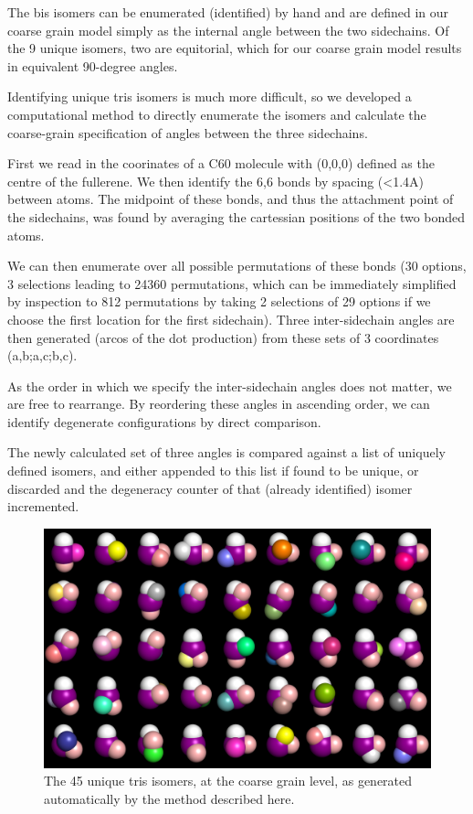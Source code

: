 \documentclass[journal=nanofd,manuscript=suppinfo]{achemso}
\begin{document}
The bis isomers can be enumerated (identified) by hand and are defined in our
coarse grain model simply as the internal angle between the two sidechains. Of
the 9 unique isomers, two are equitorial, which for our coarse grain model
results in equivalent 90-degree angles.

Identifying unique tris isomers is much more difficult, so we developed
a computational method to directly enumerate the isomers and calculate the
coarse-grain specification of angles between the three sidechains.

First we read in the coorinates of a C60 molecule with (0,0,0) defined as the
centre of the fullerene. We then identify the 6,6 bonds by spacing (<1.4A)
between atoms.
The midpoint of these bonds, and thus the attachment point of the sidechains,
was found by averaging the cartessian positions of the two bonded atoms.

We can then enumerate over all possible permutations of these bonds (30
options, 3 selections leading to 24360 permutations, which can be immediately
simplified by inspection to 812 permutations by taking 2 selections of 29
options if we choose the first location for the first sidechain).
Three inter-sidechain angles are then generated (arcos of the dot production)
from these sets of 3 coordinates (a,b;a,c;b,c).

As the order in which we specify the inter-sidechain angles does not matter, we
are free to rearrange.
By reordering these angles in ascending order, we can identify degenerate
configurations by direct comparison.

The newly calculated set of three angles is compared against a list of uniquely
defined isomers, and either appended to this list if found to be unique, or
discarded and the degeneracy counter of that (already identified) isomer incremented.

\begin{figure}[ht!]
    \begin{center}
        \includegraphics[width=\textwidth]{tris_45_isomers.png}
            \caption{\label{fig-trisCG}The 45 unique tris isomers, at the coarse grain level, as generated automatically by the method described here.}
    \end{center}
\end{figure}
\end{document}
